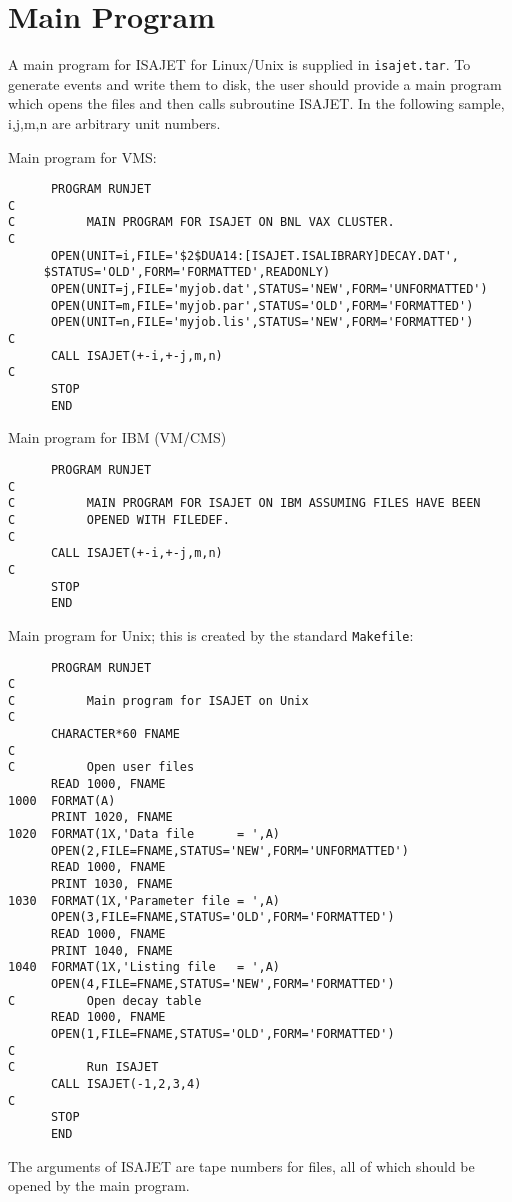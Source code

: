 \newpage
\section{Main Program\label{MAIN}}

      A main program for ISAJET for Linux/Unix is supplied in
\verb|isajet.tar|. To generate events and write them to disk, the user
should provide a main program which opens the files and then calls
subroutine ISAJET.  In the following sample, i,j,m,n are arbitrary unit
numbers.

      Main program for VMS:
\begin{verbatim}
      PROGRAM RUNJET
C
C          MAIN PROGRAM FOR ISAJET ON BNL VAX CLUSTER.
C
      OPEN(UNIT=i,FILE='$2$DUA14:[ISAJET.ISALIBRARY]DECAY.DAT',
     $STATUS='OLD',FORM='FORMATTED',READONLY)
      OPEN(UNIT=j,FILE='myjob.dat',STATUS='NEW',FORM='UNFORMATTED')
      OPEN(UNIT=m,FILE='myjob.par',STATUS='OLD',FORM='FORMATTED')
      OPEN(UNIT=n,FILE='myjob.lis',STATUS='NEW',FORM='FORMATTED')
C
      CALL ISAJET(+-i,+-j,m,n)
C
      STOP
      END
\end{verbatim}

      Main program for IBM (VM/CMS)
\begin{verbatim}
      PROGRAM RUNJET
C
C          MAIN PROGRAM FOR ISAJET ON IBM ASSUMING FILES HAVE BEEN
C          OPENED WITH FILEDEF.
C
      CALL ISAJET(+-i,+-j,m,n)
C
      STOP
      END
\end{verbatim}

      Main program for Unix; this is created by the standard 
\verb|Makefile|:
\begin{verbatim}
      PROGRAM RUNJET
C
C          Main program for ISAJET on Unix
C
      CHARACTER*60 FNAME
C
C          Open user files
      READ 1000, FNAME
1000  FORMAT(A)
      PRINT 1020, FNAME
1020  FORMAT(1X,'Data file      = ',A)
      OPEN(2,FILE=FNAME,STATUS='NEW',FORM='UNFORMATTED')
      READ 1000, FNAME
      PRINT 1030, FNAME
1030  FORMAT(1X,'Parameter file = ',A)
      OPEN(3,FILE=FNAME,STATUS='OLD',FORM='FORMATTED')
      READ 1000, FNAME
      PRINT 1040, FNAME
1040  FORMAT(1X,'Listing file   = ',A)
      OPEN(4,FILE=FNAME,STATUS='NEW',FORM='FORMATTED')
C          Open decay table
      READ 1000, FNAME
      OPEN(1,FILE=FNAME,STATUS='OLD',FORM='FORMATTED')
C
C          Run ISAJET
      CALL ISAJET(-1,2,3,4)
C
      STOP
      END
\end{verbatim}

      The arguments of ISAJET are tape numbers for files, all of which
should be opened by the main program.

